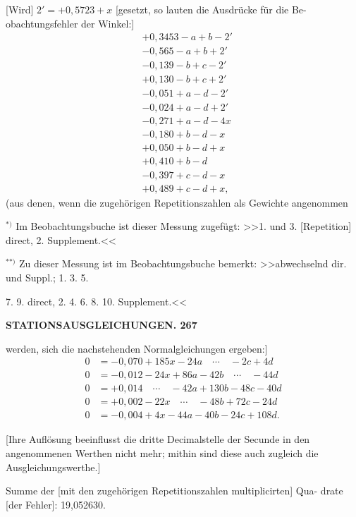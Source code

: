 \documentclass[12pt,a4paper]{article}
\theoremstyle{plain}
\theoremstyle{definition}
\theoremstyle{remark}
\begin{document}
[Wird] $2' = +0{,}5723 + x$ [gesetzt, so lauten die Ausdr\"ucke f\"ur die Be-
obachtungsfehler der Winkel:]
\begin{align*}
&+0{,}3453 - a + b - 2' \\
&-0{,}565 - a + b + 2' \\
&-0{,}139 - b + c - 2' \\
&+0{,}130 - b + c + 2' \\
&-0{,}051 + a - d - 2' \\
&-0{,}024 + a - d + 2' \\
&-0{,}271 + a - d - 4x \\
&-0{,}180 + b - d - x \\
&+0{,}050 + b - d + x \\
&+0{,}410 + b - d \\
&-0{,}397 + c - d - x \\
&+0{,}489 + c - d + x,
\end{align*}
(aus denen, wenn die zugeh\"origen Repetitionszahlen als Gewichte angenommen

\hfill $^{*)}$ Im Beobachtungsbuche ist dieser Messung zugef\"ugt: >>1. und 3. [Repetition] direct, 2. Supplement.<<

\hfill $^{**)}$ Zu dieser Messung ist im Beobachtungsbuche bemerkt: >>abwechselnd dir. und Suppl.; 1. 3. 5.

7. 9. direct, 2. 4. 6. 8. 10. Supplement.<<


\newpage

\noindent\textbf{STATIONSAUSGLEICHUNGEN. 267}

werden, sich die nachstehenden Normalgleichungen ergeben:]
\begin{align*}
0 &= -0{,}070 + 185x - 24a \quad\cdots\quad - 2c + 4d \\
0 &= -0{,}012 - 24x + 86a - 42b \quad\cdots\quad - 44d \\
0 &= +0{,}014 \quad\cdots\quad - 42a + 130b - 48c - 40d \\
0 &= +0{,}002 - 22x \quad\cdots\quad - 48b + 72c - 24d \\
0 &= -0{,}004 + 4x - 44a - 40b - 24c + 108d.
\end{align*}

[Ihre Aufl\"osung beeinflusst die dritte Decimalstelle der Secunde in den
angenommenen Werthen nicht mehr; mithin sind diese auch zugleich die
Ausgleichungswerthe.]

Summe der [mit den zugeh\"origen Repetitionszahlen multiplicirten] Qua-
drate [der Fehler]: 19{,}052630.
\end{document}
